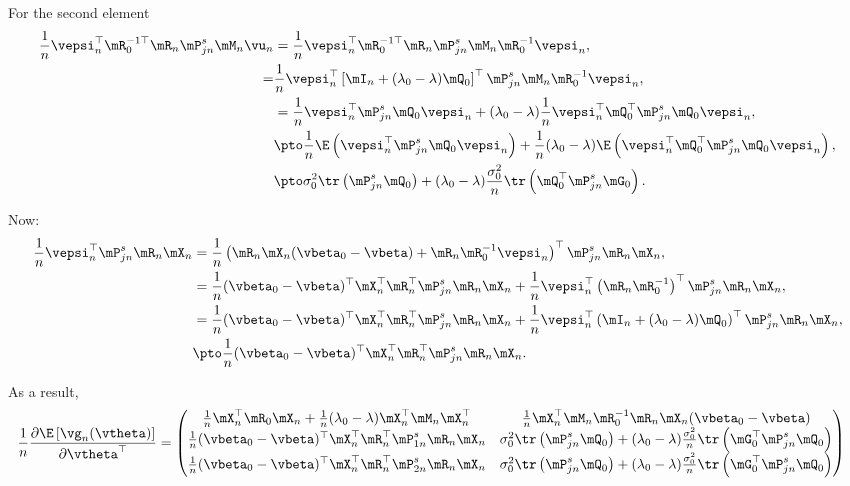 \documentclass[english,12pt]{book}\usepackage[]{graphicx}\usepackage[]{xcolor}
\begin{document}
\begin{subappendices}
For the second element
\begin{equation*}
\begin{aligned}
  \frac{1}{n}\vepsi_n^\top\mR_0^{-1\top}\mR_n\mP_{jn}^s\mM_n\vu_n & = \frac{1}{n}\vepsi_n^\top\mR_0^{-1\top}\mR_n\mP_{jn}^s\mM_n\mR_0^{-1}\vepsi_n,  \\
  = & \frac{1}{n}\vepsi_n^\top\left[\mI_n + (\lambda_0-\lambda)\mQ_0\right]^\top\mP_{jn}^s\mM_n\mR_0^{-1}\vepsi_n, \\
  & = \frac{1}{n}\vepsi_n^\top\mP_{jn}^s\mQ_0\vepsi_n + (\lambda_0 - \lambda)\frac{1}{n}\vepsi_n^\top\mQ_0^\top\mP_{jn}^s\mQ_0\vepsi_n, \\
  & \pto \frac{1}{n}\E\left(\vepsi_n^\top\mP_{jn}^s\mQ_0\vepsi_n\right)  + \frac{1}{n} (\lambda_0 - \lambda) \E\left(\vepsi_n^\top\mQ_0^\top\mP_{jn}^s\mQ_0\vepsi_n \right),\\
  & \pto \sigma_0^2 \tr\left(\mP_{jn}^{s}\mQ_0\right) + (\lambda_0- \lambda)\frac{\sigma_0^2}{n}\tr\left(\mQ_0^\top\mP_{jn}^s\mG_0\right).
\end{aligned}
\end{equation*}

Now:
\begin{equation*}
\begin{aligned}
\frac{1}{n}\vepsi_n^\top\mP_{jn}^s\mR_n\mX_n & = \frac{1}{n}\left(\mR_n\mX_n(\vbeta_0 - \vbeta) + \mR_n\mR_0^{-1}\vepsi_n\right)^\top\mP_{jn}^s\mR_n\mX_n, \\
& = \frac{1}{n}(\vbeta_0 - \vbeta)^\top\mX_n^\top\mR_n^\top\mP_{jn}^s\mR_n\mX_n + \frac{1}{n}\vepsi_n^\top\left(\mR_n\mR_0^{-1}\right)^\top\mP_{jn}^s\mR_n\mX_n, \\
& = \frac{1}{n}(\vbeta_0 - \vbeta)^\top\mX_n^\top\mR_n^\top\mP_{jn}^s\mR_n\mX_n + \frac{1}{n}\vepsi_n^\top\left(\mI_n + (\lambda_0 - \lambda)\mQ_0\right)^\top\mP_{jn}^s\mR_n\mX_n, \\
& \pto \frac{1}{n}(\vbeta_0 - \vbeta)^\top\mX_n^\top\mR_n^\top\mP_{jn}^s\mR_n\mX_n.
\end{aligned}
\end{equation*}


As a result, 
\begin{equation}
\begin{aligned}
\frac{1}{n}\frac{\partial \E\left[\vg_n(\vtheta)\right]}{\partial \vtheta^\top} & = \begin{pmatrix}
  \frac{1}{n}\mX_n^\top\mR_0\mX_n +\frac{1}{n}(\lambda_0 - \lambda)\mX^\top_n\mM_n\mX_n^\top & \frac{1}{n}\mX_n^\top\mM_n\mR_0^{-1}\mR_n\mX_n(\vbeta_0 - \vbeta) \\
  \frac{1}{n}(\vbeta_0 - \vbeta)^\top\mX_n^\top\mR_n^\top\mP_{1n}^s\mR_n\mX_n & \sigma_0^2 \tr\left(\mP_{jn}^{s}\mQ_0\right) + (\lambda_0- \lambda)\frac{\sigma_0^2}{n}\tr\left(\mG_0^\top\mP_{jn}^s\mQ_0\right) \\
  \frac{1}{n}(\vbeta_0 - \vbeta)^\top\mX_n^\top\mR_n^\top\mP_{2n}^s\mR_n\mX_n & \sigma_0^2 \tr\left(\mP_{jn}^{s}\mQ_0\right) + (\lambda_0- \lambda)\frac{\sigma_0^2}{n}\tr\left(\mG_0^\top\mP_{jn}^s\mQ_0\right)
\end{pmatrix}
\end{aligned}
\end{equation}


\end{subappendices}
\end{document}
